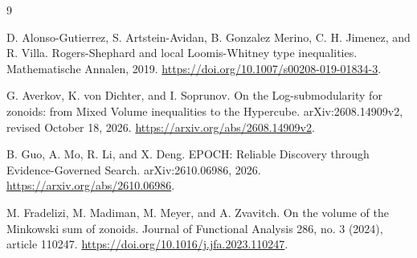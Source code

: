 \documentclass[11pt]{article}
\theoremstyle{remark}
\begin{document}
\begin{thebibliography}{9}


D. Alonso-Gutierrez, S. Artstein-Avidan,
B. Gonzalez Merino, C. H. Jimenez, and R. Villa.
Rogers-Shephard and local Loomis-Whitney type
inequalities.
Mathematische Annalen, 2019.
\url{https://doi.org/10.1007/s00208-019-01834-3}.


G. Averkov, K. von Dichter, and I. Soprunov.
On the Log-submodularity for zonoids: from Mixed Volume inequalities to the Hypercube.
arXiv:2608.14909v2, revised October 18, 2026.
\url{https://arxiv.org/abs/2608.14909v2}.


B. Guo, A. Mo, R. Li, and X. Deng.
EPOCH: Reliable Discovery through Evidence-Governed Search.
arXiv:2610.06986, 2026.
\url{https://arxiv.org/abs/2610.06986}.

M. Fradelizi, M. Madiman, M. Meyer, and A. Zvavitch.
On the volume of the Minkowski sum of zonoids.
Journal of Functional Analysis 286, no. 3 (2024), article 110247.
\url{https://doi.org/10.1016/j.jfa.2023.110247}.



\end{thebibliography}
\end{document}
